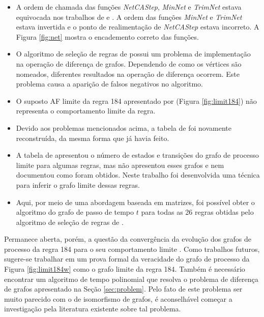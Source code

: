 \documentclass[12pt,a4paper]{article}
\begin{document}
\begin{itemize}
\item A ordem de chamada das funções \emph{NetCAStep}, \emph{MinNet} e \emph{TrimNet} estava
equivocada nos trabalhos de  e .
A ordem das funções \emph{MinNet} e \emph{TrimNet} estava invertida e o ponto de
realimentação de \emph{NetCAStep} estava incorreto. A Figura \ref{fig:net} mostra o
encademento correto das funções.

\item O algoritmo de seleção de regras de  possui
um problema de implementação na operação de diferença de grafos. Dependendo
de como os vértices são nomeados, diferentes resultados na operação de
diferença ocorrem. Este problema causa a aparição de falsos negativos no
algoritmo.

\item O suposto AF limite da regra 184 apresentado por 
(Figura \ref{fig:limit184}) não representa o comportamento limite da regra.

\item Devido aos problemas mencionados acima, a tabela de
 foi novamente reconstruída, da mesma forma que
 já havia feito.

\item A tabela de  apresentou o número de estados
e transições do grafo de processo limite para algumas regras, mas não
apresentou esses grafos e nem documentou como foram obtidos. Neste trabalho
foi desenvolvida uma técnica para inferir o grafo limite dessas regras.

\item Aqui, por meio de uma abordagem baseada em matrizes, foi possível
obter o algoritmo do grafo de passo de tempo $t$ para todas as 26 regras
obtidas pelo algoritmo de seleção de regras de .
\end{itemize}

Permanece aberta, porém, a questão da convergência da evolução dos grafos
de processo da regra 184 para o seu comportamento limite .
Como trabalhos futuros, sugere-se trabalhar em um prova formal da veracidade
do grafo de processo da Figura \ref{fig:limit184w} como o grafo limite da regra
184. Também é necessário encontrar um algoritmo de tempo polinomial que resolva
o problema de diferença de grafos apresentado na Seção \ref{sec:problem}.
Pelo fato de este problema ser muito parecido com o de isomorfismo de grafos,
é aconselhável começar a investigação pela literatura existente sobre tal
problema.
\end{document}
